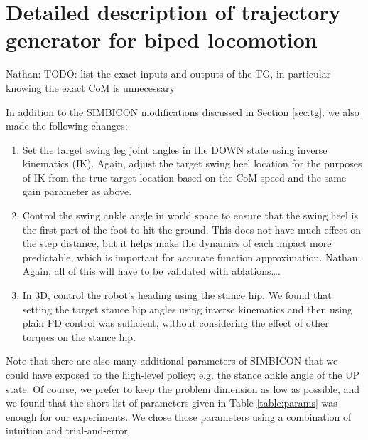 \documentclass[conference]{IEEEtran}
\newcommand{\nhatch}[1]{{\leavevmode\color{magenta} Nathan: #1}}
\begin{document}




\appendix

\section{Detailed description of trajectory generator for biped locomotion}

\label{app:simbicon}

\nhatch{TODO: list the exact inputs and outputs of the TG, in particular knowing the exact CoM is unnecessary}

In addition to the SIMBICON modifications discussed in Section \ref{sec:tg}, we also made the following changes:

\begin{enumerate}
  \item Set the target swing leg joint angles in the DOWN state using inverse kinematics (IK).
    Again, adjust the target swing heel location for the purposes of IK from the true target location based on the CoM speed and the same gain parameter as above.

  \item Control the swing ankle angle in world space to ensure that the swing heel is the first part of the foot to hit the ground.
    This does not have much effect on the step distance, but it helps make the dynamics of each impact more predictable, which is important for accurate function approximation.
    \nhatch{Again, all of this will have to be validated with ablations\dots.}

  \item In 3D, control the robot's heading using the stance hip.
    We found that setting the target stance hip angles using inverse kinematics and then using plain PD control was sufficient, without considering the effect of other torques on the stance hip.
\end{enumerate}

Note that there are also many additional parameters of SIMBICON that we could have exposed to the high-level policy; e.g. the stance ankle angle of the UP state.
Of course, we prefer to keep the problem dimension as low as possible, and we found that the short list of parameters given in Table \ref{table:params} was enough for our experiments.
We chose those parameters using a combination of intuition and trial-and-error.
\end{document}
